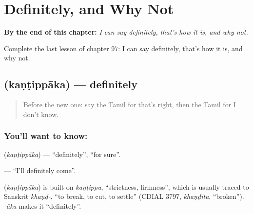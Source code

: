 
\chapter{Definitely, and Why Not}
\label{ch:ta-definitely}

\begin{chapteropening}
\textbf{By the end of this chapter:} \emph{I can say definitely, that's how it is, and why not.}

Complete the last lesson of chapter 97: I can say definitely, that's how it is, and why not.
\end{chapteropening}

\section[\texorpdfstring{\ta{கண்டிப்பாக} (kaṇṭippāka)}{கண்டிப்பாக (kaṇṭippāka)}]{ (kaṇṭippāka) — definitely}

\label{lesson:TA-C97-definitely}



\begin{quote}
Before the new one: say the Tamil for that's right, then the Tamil for I don't know.
\end{quote}

\subsection*{You'll want to know: }
\textbf{} (\emph{kaṇṭippāka}) — \textquotedblleft{}definitely\textquotedblright{}, \textquotedblleft{}for sure\textquotedblright{}.

\textbf{ } — \textquotedblleft{}I'll definitely come\textquotedblright{}.

\begin{cousinweb}
\textbf{} (\emph{kaṇṭippāka}) is built on \emph{kaṇṭippu}, \textquotedblleft{}strictness, firmness\textquotedblright{}, which is usually traced to Sanskrit \emph{khaṇḍ-}, \textquotedblleft{}to break, to cut, to settle\textquotedblright{} (CDIAL 3797, \emph{khaṇḍita}, \textquotedblleft{}broken\textquotedblright{}). \emph{-āka} makes it \textquotedblleft{}definitely\textquotedblright{}.
\end{cousinweb}

